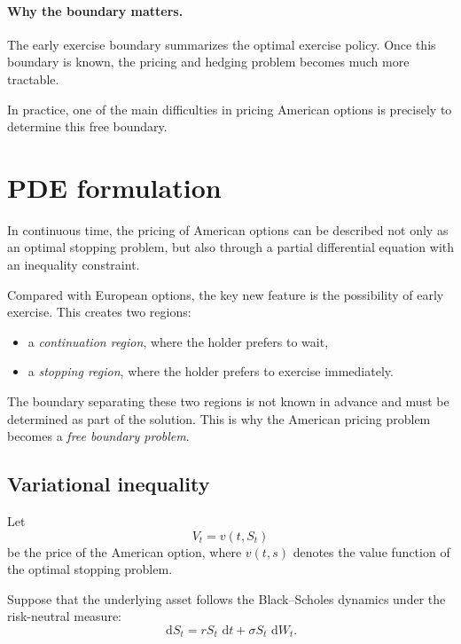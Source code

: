 \documentclass[11pt]{article}
\newcommand{\dd}{\,\mathrm{d}}
\theoremstyle{definition}
\theoremstyle{plain}
\begin{document}
\paragraph{Why the boundary matters.}
The early exercise boundary summarizes the optimal exercise policy.
Once this boundary is known, the pricing and hedging problem becomes
much more tractable.

In practice, one of the main difficulties in pricing American options
is precisely to determine this free boundary.


\section{PDE formulation}

In continuous time, the pricing of American options can be described not
only as an optimal stopping problem, but also through a partial
differential equation with an inequality constraint.

Compared with European options, the key new feature is the possibility
of early exercise.
This creates two regions:
\begin{itemize}[leftmargin=1.4em]
    \item a \emph{continuation region}, where the holder prefers to wait,
    \item a \emph{stopping region}, where the holder prefers to exercise immediately.
\end{itemize}

The boundary separating these two regions is not known in advance and
must be determined as part of the solution.
This is why the American pricing problem becomes a \emph{free boundary problem}.

\subsection{Variational inequality}

Let
\[
V_t = v(t,S_t)
\]
be the price of the American option, where \(v(t,s)\) denotes the value
function of the optimal stopping problem.

Suppose that the underlying asset follows the Black--Scholes dynamics
under the risk-neutral measure:
\[
\dd S_t = rS_t\,\dd t + \sigma S_t\,\dd W_t.
\]
\end{document}

